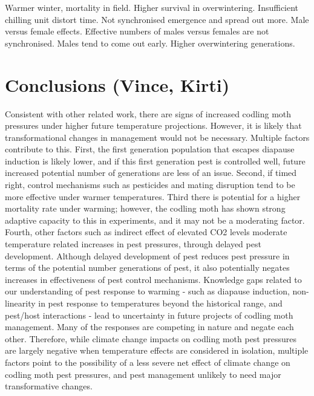 \documentclass[12pt]{article}
\theoremstyle{plain}
\theoremstyle{definition}
\theoremstyle{definition}
\begin{document}
Warmer winter, mortality in field. Higher 
survival in overwintering. Insufficient chilling 
unit distort time. Not synchronised emergence 
and spread out more. Male versus female effects. 
Effective numbers of males versus females are 
not synchronised. Males tend to come out early.  Higher overwintering generations.
\section{Conclusions (Vince, Kirti)}

Consistent with other related work, there are 
signs of increased codling moth pressures under 
higher future temperature projections. However, it 
is likely that transformational changes in management
 would not be necessary. Multiple factors 
 contribute to this. First, the first generation 
 population that escapes diapause induction 
 is likely lower, and if this first generation pest 
 is controlled well, future increased potential 
 number of generations are less of an issue. 
 Second, if timed right, control mechanisms 
 such as pesticides and mating disruption tend 
 to be more effective under warmer temperatures. 
 Third there is potential for a higher mortality rate 
 under warming; however, the codling moth has 
 shown strong adaptive capacity to this in 
 experiments, and it may not be a moderating 
 factor. Fourth, other factors such as indirect effect 
 of elevated CO2 levels moderate temperature 
 related increases in pest pressures, through delayed 
 pest development. Although delayed development 
 of pest reduces pest pressure in terms of the 
 potential number generations of pest, it also
  potentially  negates increases in effectiveness 
  of pest control mechanisms.  Knowledge gaps 
  related to our understanding of pest response 
  to warming - such as diapause induction, 
  non-linearity in pest response to temperatures
   beyond the historical range, and pest/host 
   interactions - lead to uncertainty in future projects 
   of codling moth management. Many of the 
   responses are competing in nature and negate 
   each other. Therefore, while climate change 
   impacts on codling moth pest pressures are 
   largely negative when temperature effects 
   are considered in isolation, multiple factors 
   point to the possibility of a less severe net 
   effect of climate change on codling moth 
   pest pressures,  and pest management 
   unlikely to need major transformative changes.
\end{document}

